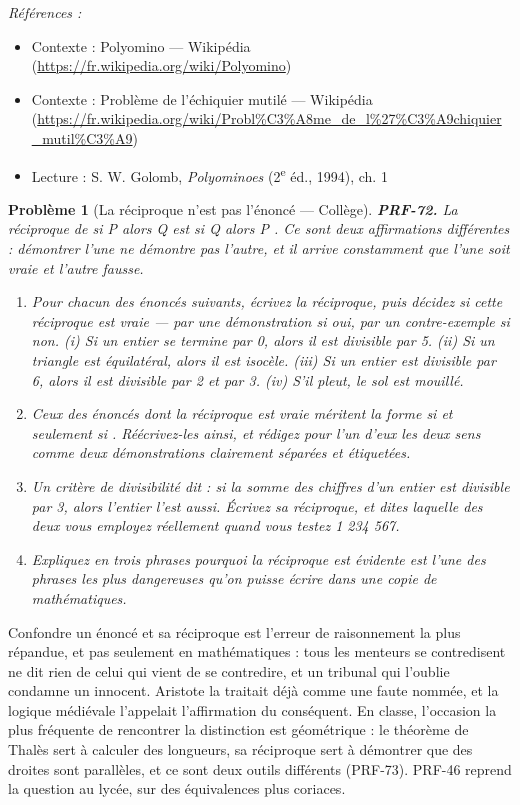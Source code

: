 \documentclass[11pt]{article}
\newtheorem{problem}{Problème}
\newenvironment{refs}{\par\small\noindent\emph{Références :}\begin{itemize}\setlength\itemsep{0pt}}{\end{itemize}\normalsize}
\begin{document}
\begin{refs}
\item Contexte : Polyomino --- Wikipédia (\url{https://fr.wikipedia.org/wiki/Polyomino})
\item Contexte : Problème de l'échiquier mutilé --- Wikipédia (\url{https://fr.wikipedia.org/wiki/Probl%C3%A8me_de_l%27%C3%A9chiquier_mutil%C3%A9})
\item Lecture : S. W. Golomb, \textit{Polyominoes} (2\textsuperscript{e} éd., 1994), ch. 1
\end{refs}

\bigskip

\begin{problem}[{La réciproque n'est pas l'énoncé --- Collège}]
\textbf{PRF-72.} La réciproque de \og{} si P alors Q \fg{} est \og{} si Q alors P \fg{}. Ce sont deux
affirmations différentes : démontrer l'une ne démontre pas l'autre, et il arrive
constamment que l'une soit vraie et l'autre fausse.
\begin{enumerate}
\item[(a)] Pour chacun des énoncés suivants, écrivez la réciproque, puis décidez si cette
réciproque est vraie --- par une démonstration si oui, par un contre-exemple si non. (i) Si un
entier se termine par 0, alors il est divisible par 5. (ii) Si un triangle est équilatéral,
alors il est isocèle. (iii) Si un entier est divisible par 6, alors il est divisible par 2
et par 3. (iv) S'il pleut, le sol est mouillé.
\item[(b)] Ceux des énoncés dont la réciproque est vraie méritent la forme \og{} si et seulement si \fg{}.
Réécrivez-les ainsi, et rédigez pour l'un d'eux les deux sens comme deux démonstrations
clairement séparées et étiquetées.
\item[(c)] Un critère de divisibilité dit : si la somme des chiffres d'un entier est divisible par
3, alors l'entier l'est aussi. Écrivez sa réciproque, et dites laquelle des deux vous
employez réellement quand vous testez 1 234 567.
\item[(d)] Expliquez en trois phrases pourquoi \og{} la réciproque est évidente \fg{} est l'une des phrases
les plus dangereuses qu'on puisse écrire dans une copie de mathématiques.
\end{enumerate}

\end{problem}

\noindent Confondre un énoncé et sa réciproque est l'erreur de raisonnement la plus
répandue, et pas seulement en mathématiques : \og{} tous les menteurs se contredisent \fg{} ne dit
rien de celui qui vient de se contredire, et un tribunal qui l'oublie condamne un innocent.
Aristote la traitait déjà comme une faute nommée, et la logique médiévale l'appelait
l'affirmation du conséquent. En classe, l'occasion la plus fréquente de rencontrer la
distinction est géométrique : le théorème de Thalès sert à calculer des longueurs, sa
réciproque sert à démontrer que des droites sont parallèles, et ce sont deux outils
différents (PRF-73). PRF-46 reprend la question au lycée, sur des équivalences plus
coriaces.
\end{document}
